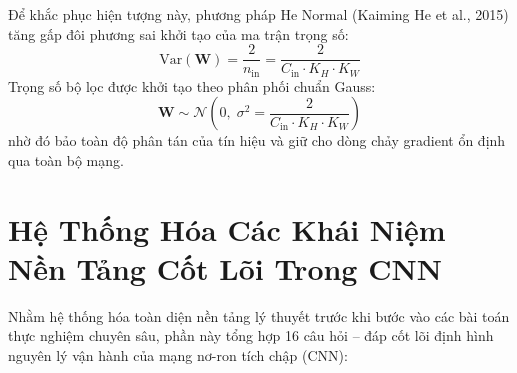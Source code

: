 \documentclass[12pt,a4paper]{report}
\begin{document}
Để khắc phục hiện tượng này, phương pháp He Normal (Kaiming He et al., 2015) tăng gấp đôi phương sai khởi tạo của ma trận trọng số:
\begin{equation}
    \text{Var}(\mathbf{W}) = \frac{2}{n_{\text{in}}} = \frac{2}{C_{\text{in}} \cdot K_H \cdot K_W}
\end{equation}
Trọng số bộ lọc được khởi tạo theo phân phối chuẩn Gauss:
\begin{equation}
    \mathbf{W} \sim \mathcal{N}\left(0, \; \sigma^2 = \frac{2}{C_{\text{in}} \cdot K_H \cdot K_W}\right)
\end{equation}
nhờ đó bảo toàn độ phân tán của tín hiệu và giữ cho dòng chảy gradient ổn định qua toàn bộ mạng.

\section{Hệ Thống Hóa Các Khái Niệm Nền Tảng Cốt Lõi Trong CNN}
Nhằm hệ thống hóa toàn diện nền tảng lý thuyết trước khi bước vào các bài toán thực nghiệm chuyên sâu, phần này tổng hợp 16 câu hỏi -- đáp cốt lõi định hình nguyên lý vận hành của mạng nơ-ron tích chập (CNN):
\end{document}
